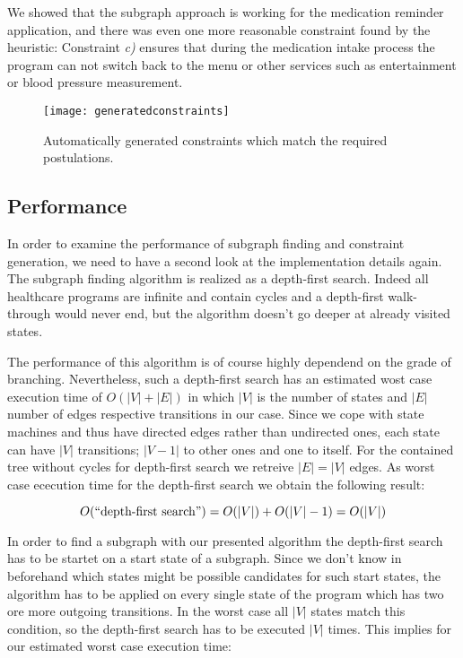 We showed that the subgraph approach is working for the medication reminder application, and there was even one more reasonable constraint found by the heuristic: Constraint \emph{c)} ensures that during the medication intake process the program can not switch back to the menu or other services such as entertainment or blood pressure measurement.



\begin{figure}[htbp]
  \centering
  \texttt{[image: generatedconstraints]}
  \caption{Automatically generated constraints which match the required postulations.}
  \label{fig:generatedconstraints}
\end{figure}






\subsection{Performance}

In order to examine the performance of subgraph finding and constraint generation, we need to have a second look at the implementation details again. The subgraph finding algorithm is realized as a depth-first search. Indeed all healthcare programs are infinite and contain cycles and a depth-first walk-through would never end, but the algorithm doesn't go deeper at already visited states.

The performance of this algorithm is of course highly dependend on the grade of branching. Nevertheless, such a depth-first search has an estimated wost case execution time of $O(|V|+|E|)$ in which $|V|$ is the number of states and $|E|$ number of edges respective transitions in our case.
Since we cope with state machines and thus have directed edges rather than undirected ones, each state can have $|V|$ transitions; $|V-1|$ to other ones and one to itself. For the contained tree without cycles for depth-first search we retreive $|E|=|V|$ edges.
As worst case ececution time for the depth-first search we obtain the following result:

\begin{equation}
O(\textnormal{``depth-first search''})=O(|V|)+O(|V|-1)=O(|V|)
\end{equation}

In order to find a subgraph with our presented algorithm the depth-first search has to be startet on a start state of a subgraph. Since we don't know in beforehand which states might be possible candidates for such start states, the algorithm has to be applied on every single state of the program which has two ore more outgoing transitions. In the worst case all $|V|$ states match this condition, so the depth-first search has to be executed $|V|$ times. This implies for our estimated worst case execution time:

